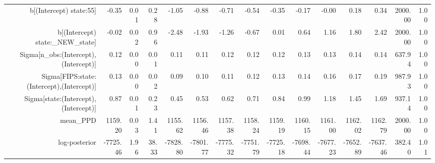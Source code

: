 \begin{table}[ht]
\begin{tabular}{rrrrrrrrrrrrrrr}
  b[(Intercept) state:55] & -0.35 & 0.01 & 0.28 & -1.05 & -0.88 & -0.71 & -0.54 & -0.35 & -0.17 & -0.00 & 0.18 & 0.34 & 2000.00 & 1.00 \\ 
  b[(Intercept) state:\_NEW\_state] & -0.02 & 0.02 & 0.96 & -2.48 & -1.93 & -1.26 & -0.67 & 0.01 & 0.64 & 1.16 & 1.80 & 2.42 & 2000.00 & 1.00 \\ 
  Sigma[n\_obs:(Intercept),(Intercept)] & 0.12 & 0.00 & 0.01 & 0.11 & 0.11 & 0.12 & 0.12 & 0.12 & 0.13 & 0.13 & 0.14 & 0.14 & 637.94 & 1.00 \\ 
  Sigma[FIPS:state:(Intercept),(Intercept)] & 0.13 & 0.00 & 0.02 & 0.09 & 0.10 & 0.11 & 0.12 & 0.13 & 0.14 & 0.16 & 0.17 & 0.19 & 987.93 & 1.00 \\ 
  Sigma[state:(Intercept),(Intercept)] & 0.87 & 0.01 & 0.23 & 0.45 & 0.53 & 0.62 & 0.71 & 0.84 & 0.99 & 1.18 & 1.45 & 1.69 & 937.14 & 1.00 \\ 
  mean\_PPD & 1159.20 & 0.03 & 1.41 & 1155.62 & 1156.46 & 1157.38 & 1158.24 & 1159.19 & 1160.15 & 1161.00 & 1162.02 & 1162.79 & 2000.00 & 1.00 \\ 
  log-posterior & -7725.46 & 1.96 & 38.33 & -7828.80 & -7801.77 & -7775.32 & -7751.79 & -7725.18 & -7698.44 & -7677.23 & -7652.89 & -7637.46 & 382.40 & 1.01 \\ 
   \hline
\end{tabular}
\end{table}
